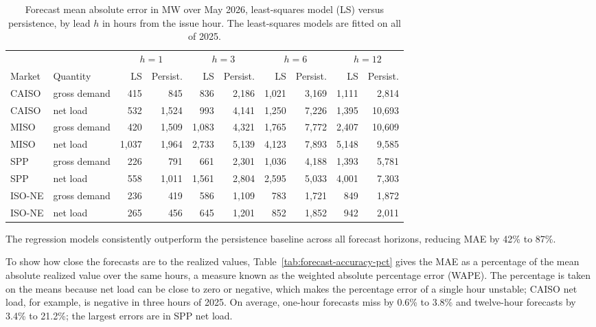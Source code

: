 \documentclass{UNCC-thesis}
\begin{document}
\begin{table}[htbp]
  \centering
  \footnotesize
  \caption[Forecast mean absolute error in MW, May 2026]{Forecast mean absolute error in MW
  over May 2026, least-squares model (LS) versus persistence, by lead \(h\) in hours from the
  issue hour. The least-squares models are fitted on all of 2025.}
  \label{tab:forecast-accuracy}
  \setlength{\tabcolsep}{4pt}
  \begin{tabular}{@{}llrrrrrrrr@{}}
    \toprule
    & & \multicolumn{2}{c}{\(h=1\)} & \multicolumn{2}{c}{\(h=3\)}
        & \multicolumn{2}{c}{\(h=6\)} & \multicolumn{2}{c}{\(h=12\)} \\
    \cmidrule(lr){3-4}\cmidrule(lr){5-6}\cmidrule(lr){7-8}\cmidrule(l){9-10}
    Market & Quantity & LS & Persist. & LS & Persist.
                & LS & Persist. & LS & Persist. \\
    \midrule
    CAISO          & gross demand &   415 &   845 &   836 & 2,186 & 1,021 & 3,169 & 1,111 &  2,814 \\
    CAISO          & net load     &   532 & 1,524 &   993 & 4,141 & 1,250 & 7,226 & 1,395 & 10,693 \\
    MISO           & gross demand &   420 & 1,509 & 1,083 & 4,321 & 1,765 & 7,772 & 2,407 & 10,609 \\
    MISO           & net load     & 1,037 & 1,964 & 2,733 & 5,139 & 4,123 & 7,893 & 5,148 &  9,585 \\
    SPP            & gross demand &   226 &   791 &   661 & 2,301 & 1,036 & 4,188 & 1,393 &  5,781 \\
    SPP            & net load     &   558 & 1,011 & 1,561 & 2,804 & 2,595 & 5,033 & 4,001 &  7,303 \\
    ISO-NE         & gross demand &   236 &   419 &   586 & 1,109 &   783 & 1,721 &   849 &  1,872 \\
    ISO-NE         & net load     &   265 &   456 &   645 & 1,201 &   852 & 1,852 &   942 &  2,011 \\
    \bottomrule
  \end{tabular}
\end{table}

The regression models consistently outperform the persistence baseline across all
forecast horizons, reducing MAE by 42\% to 87\%.

To show how close the forecasts are to the realized values,
Table~\ref{tab:forecast-accuracy-pct} gives the MAE as a percentage of the mean
absolute realized value over the same hours, a measure known as the weighted absolute
percentage error (WAPE). The percentage is taken on the means
because net load can be close to zero or negative, which makes the percentage error
of a single hour unstable; CAISO net load, for example, is negative in three hours of 2025.
On average, one-hour forecasts miss by 0.6\% to 3.8\%
and twelve-hour forecasts by 3.4\% to 21.2\%; the largest errors are in SPP net
load.
\end{document}
